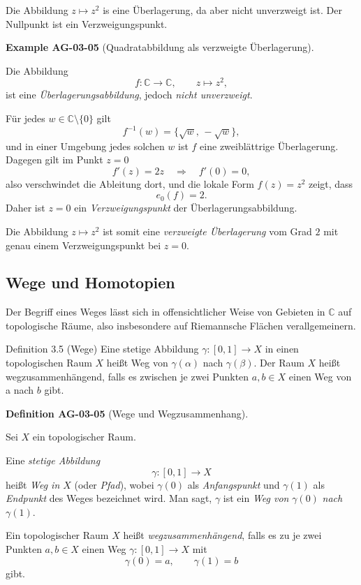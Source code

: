 \documentclass[10pt, letterpaper]{article}
\newcommand{\C}{\mathbb{C}}
\newcommand{\CustomHeading}[3]{%
  \par\medskip\noindent%
  \textbf{#1 #2} \textnormal{(#3)}.\enskip%
}
\newenvironment{DEF}[2]{\begin{unitbox}\CustomHeading{Definition}{#1}{#2}}{\end{unitbox}}
\newenvironment{EXA}[2]{\begin{unitbox}\CustomHeading{Example}{#1}{#2}}{\end{unitbox}}
\begin{document}
Die Abbildung $z \mapsto z^{2}$ is eine Überlagerung, da aber nicht unverzweigt ist. Der Nullpunkt ist ein Verzweigungspunkt.

\begin{EXA}{AG-03-05}{Quadratabbildung als verzweigte Überlagerung}
Die Abbildung
\[
f:\C\longrightarrow\C,\qquad z\longmapsto z^{2},
\]
ist eine \emph{Überlagerungsabbildung}, jedoch \emph{nicht unverzweigt}.

\medskip
\noindent
Für jedes \(w\in\C\setminus\{0\}\) gilt
\[
f^{-1}(w)=\{\sqrt{w},\,-\sqrt{w}\},
\]
und in einer Umgebung jedes solchen \(w\) ist \(f\) eine zweiblättrige
Überlagerung. Dagegen gilt im Punkt \(z=0\)
\[
f'(z)=2z \quad\Rightarrow\quad f'(0)=0,
\]
also verschwindet die Ableitung dort, und die lokale Form
\(f(z)=z^{2}\) zeigt, dass
\[
e_{0}(f)=2.
\]
Daher ist \(z=0\) ein \emph{Verzweigungspunkt} der Überlagerungsabbildung.

\medskip
\noindent
Die Abbildung \(z\mapsto z^{2}\) ist somit eine \emph{verzweigte Überlagerung}
vom Grad \(2\) mit genau einem Verzweigungspunkt bei \(z=0\).
\end{EXA}

\pagebreak

\subsection{Wege und Homotopien}
Der Begriff eines Weges lässt sich in offensichtlicher Weise von Gebieten in $\mathbb{C}$ auf topologische Räume, also insbesondere auf Riemannsche Flächen verallgemeinern.

Definition 3.5 (Wege) Eine stetige Abbildung $\gamma:[0,1] \longrightarrow X$ in einen topologischen Raum $X$ heißt Weg von $\gamma(\alpha)$ nach $\gamma(\beta)$. Der Raum $X$ heißt wegzusammenhängend, falls es zwischen je zwei Punkten $a, b \in X$ einen Weg von a nach $b$ gibt.

\begin{DEF}{AG-03-05}{Wege und Wegzusammenhang}
Sei \(X\) ein topologischer Raum.

\medskip
\noindent
Eine \emph{stetige Abbildung}
\[
\gamma:[0,1]\longrightarrow X
\]
heißt \emph{Weg in \(X\)} (oder \emph{Pfad}), wobei
\(\gamma(0)\) als \emph{Anfangspunkt} und \(\gamma(1)\) als \emph{Endpunkt}
des Weges bezeichnet wird.
Man sagt, \(\gamma\) ist ein \emph{Weg von} \(\gamma(0)\) \emph{nach} \(\gamma(1)\).

\medskip
\noindent
Ein topologischer Raum \(X\) heißt \emph{wegzusammenhängend},
falls es zu je zwei Punkten \(a,b\in X\)
einen Weg \(\gamma:[0,1]\to X\) mit
\[
\gamma(0)=a,\qquad \gamma(1)=b
\]
gibt.
\end{DEF}
\end{document}
